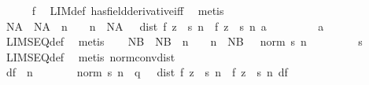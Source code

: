 \begin{isabellebody}
\ \ \ \ \isamarkupfalse%
\ f\ \isamarkupfalse%
\ LIM{\isacharunderscore}{\kern0pt}def\ has{\isacharunderscore}{\kern0pt}field{\isacharunderscore}{\kern0pt}derivative{\isacharunderscore}{\kern0pt}iff\ \isamarkupfalse%
\ metis\isanewline
\ \ \isamarkupfalse%
\ NA\ \ NA{\isacharcolon}{\kern0pt}\ {\isachardoublequoteopen}{\isasymAnd}{\isasymepsilon}\ n{\isachardot}{\kern0pt}\ {\isasymlbrakk}{\isasymepsilon}\ {\isachargreater}{\kern0pt}\ {}{\isacharsemicolon}{\kern0pt}\ n\ {\isasymge}\ NA\ {\isasymepsilon}{\isasymrbrakk}\ {\isasymLongrightarrow}\ dist\ {\isacharparenleft}{\kern0pt}{\isacharparenleft}{\kern0pt}f\ {\isacharparenleft}{\kern0pt}z\ {\isacharplus}{\kern0pt}\ s\ n{\isacharparenright}{\kern0pt}\ {\isacharminus}{\kern0pt}\ f\ z{\isacharparenright}{\kern0pt}\ {\isacharslash}{\kern0pt}\ s\ n{\isacharparenright}{\kern0pt}\ a\ {\isacharless}{\kern0pt}\ {\isasymepsilon}{\isachardoublequoteclose}\ \isanewline
\ \ \ \ \isamarkupfalse%
\ a\ \isamarkupfalse%
\ LIMSEQ{\isacharunderscore}{\kern0pt}def\ \isamarkupfalse%
\ metis\isanewline
\ \ \isamarkupfalse%
\ NB\ \ NB{\isacharcolon}{\kern0pt}\ {\isachardoublequoteopen}{\isasymAnd}{\isasymepsilon}\ n{\isachardot}{\kern0pt}\ {\isasymlbrakk}{\isasymepsilon}\ {\isachargreater}{\kern0pt}\ {}{\isacharsemicolon}{\kern0pt}\ n\ {\isasymge}\ NB\ {\isasymepsilon}{\isasymrbrakk}\ {\isasymLongrightarrow}\ norm\ {\isacharparenleft}{\kern0pt}s\ n{\isacharparenright}{\kern0pt}\ {\isacharless}{\kern0pt}\ {\isasymepsilon}{\isachardoublequoteclose}\ \isanewline
\ \ \ \ \isamarkupfalse%
\ s\ \isamarkupfalse%
\ LIMSEQ{\isacharunderscore}{\kern0pt}def\ \isamarkupfalse%
\ {\isacharparenleft}{\kern0pt}metis\ norm{\isacharunderscore}{\kern0pt}conv{\isacharunderscore}{\kern0pt}dist{\isacharparenright}{\kern0pt}\isanewline
\ \ \isamarkupfalse%
\ df{\isacharcolon}{\kern0pt}\ {\isachardoublequoteopen}{\isasymAnd}{\isasymepsilon}\ n{\isachardot}{\kern0pt}\ {\isasymepsilon}\ {\isachargreater}{\kern0pt}\ {}\ {\isasymLongrightarrow}\ {\isasymlbrakk}{}\ {\isacharless}{\kern0pt}\ {\isasymepsilon}{\isacharsemicolon}{\kern0pt}\ norm\ {\isacharparenleft}{\kern0pt}s\ n{\isacharparenright}{\kern0pt}\ {\isacharless}{\kern0pt}\ q\ {\isasymepsilon}{\isasymrbrakk}\ {\isasymLongrightarrow}\ dist\ {\isacharparenleft}{\kern0pt}{\isacharparenleft}{\kern0pt}f\ {\isacharparenleft}{\kern0pt}z\ {\isacharplus}{\kern0pt}\ s\ n{\isacharparenright}{\kern0pt}\ {\isacharminus}{\kern0pt}\ f\ z{\isacharparenright}{\kern0pt}\ {\isacharslash}{\kern0pt}\ s\ n{\isacharparenright}{\kern0pt}\ df\ {\isacharless}{\kern0pt}\ {\isasymepsilon}{\isachardoublequoteclose}\isanewline

\end{isabellebody}
